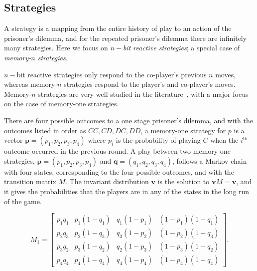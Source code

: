 \documentclass{article}
\theoremstyle{definition}
\begin{document}
\subsection{Strategies}

A strategy is a mapping from the entire history of play to an action of the
prisoner's dilemma, and for the repeated prisoner's dilemma there are infinitely
many strategies. Here we focus on \textit{\(n-\)bit reactive strategies}; a
special case of \textit{memory-\(n\) strategies}.

\(n-\)bit reactive strategies only respond to the co-player's previous \(n\)
moves, whereas memory-\(n\) strategies respond to the player's and co-player's
moves. Memory-\(n\) strategies are very well studied in the
literature~\citep{baek:scientific:2016, hilbe:PNAS:2017,
glynatsi:scientific:2020, press:PNAS:2012, stewart:scientific:2016}, with a major
focus on the case of memory-one strategies.

There are four possible outcomes to a one stage prisoner's dilemma, and with the
outcomes listed in order as \(CC, CD, DC, DD\), a memory-one strategy for \(p\)
is a vector \(\mathbf{p} = (p_1, p_2, p_3, p_4)\) where \(p_i\) is the
probability of playing \(C\) when the \(i^{\text{th}}\) outcome occurred in the
previous round. A play between two memory-one strategies, \(\mathbf{p} = (p_1,
p_2, p_3, p_4)\) and \(\mathbf{q} = (q_1, q_2, q_3, q_4)\), follows a Markov
chain with four states, corresponding to the four possible outcomes, and with
the transition matrix \(M\). The invariant distribution \(\mathbf{v}\) is the
solution to \(\mathbf{v} M = \mathbf{v}\), and it gives the probabilities that
the players are in any of the states in the long run of the game.

\begin{equation}
\displaystyle M_1 = \left[\begin{matrix}p_{1} q_{1} & p_{1} \left(1 - q_{1}\right) & q_{1} \left(1 - p_{1}\right) & \left(1 - p_{1}\right) \left(1 - q_{1}\right)\\
  p_{2} q_{3} & p_{2} \left(1 - q_{3}\right) & q_{3} \left(1 - p_{2}\right) & \left(1 - p_{2}\right) \left(1 - q_{3}\right)\\
  p_{3} q_{2} & p_{3} \left(1 - q_{2}\right) & q_{2} \left(1 - p_{3}\right) & \left(1 - p_{3}\right) \left(1 - q_{2}\right)\\
  p_{4} q_{4} & p_{4} \left(1 - q_{4}\right) & q_{4} \left(1 - p_{4}\right) & \left(1 - p_{4}\right) \left(1 - q_{4}\right)\end{matrix}\right].
\end{equation}
\end{document}
